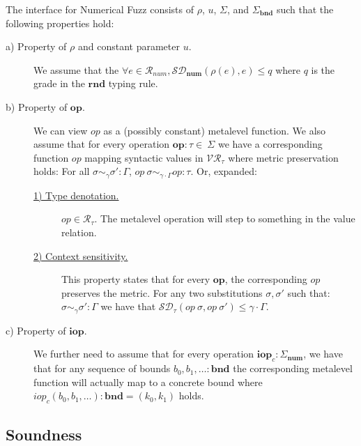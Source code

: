 \begin{definition}
  \label{def:numfuzz-interface}
  The interface for Numerical Fuzz consists of $\rho$, $u$, $\Sigma$, and
  $\Sigma_{\mathbf{bnd}}$ such that the following properties hold: 
\begin{description}
  \item[a) Property of $\rho$ and constant parameter $u$.] We assume that the
    $\forall e \in \mathcal{R}_{num}, \mathcal{SD}_{\mathbf{num}}(\rho(e), e)
    \leq q$ where $q$ is the grade in the $\mathbf{rnd}$ typing rule.
  \item[b) Property of $\mathbf{op}$.] 
    We can view $\textit{op}$ as a (possibly constant) metalevel function.
    We also assume that for every operation
    $\mathbf{op} : \tau \in \ \Sigma$ we have a
    corresponding function $op$ mapping syntactic values in
    $\mathcal{VR}_{\tau}$ where metric preservation holds: For all $\sigma
    \sim_{\gamma} \sigma' : \Gamma$, $\textit{op}~\sigma \sim_{\gamma \cdot
    \Gamma} \textit{op} : \tau$.
    Or, expanded:
    \begin{description}
      \item[\underline{1) Type denotation.}] $\mathit{op} \in
        \mathcal{R}_{\tau}$. The metalevel operation will step to something in the
        value relation.
      \item[\underline{2) Context sensitivity.}]
        This property states that for every $\textbf{op}$, the
        corresponding $\textit{op}$ preserves the metric. For any two
        substitutions $\sigma, \sigma'$ such that:
        $\sigma \sim_{\gamma} \sigma' : \Gamma$
        we have that
        $\mathcal{SD}_{\tau}(\textit{op}~\sigma, \textit{op}~\sigma') \leq \gamma \cdot \Gamma$.
    \end{description} \item[c) Property of $\mathbf{iop}$.] We further need to
      assume that for every operation $\mathbf{iop}_c : \Sigma_\textbf{num}$, we
      have that for any sequence of bounds $b_0, b_1, \ldots : \textbf{bnd}$ the
      corresponding metalevel function will actually map to a concrete bound
      where $\textit{iop}_c(b_0, b_1, \ldots) : \textbf{bnd} = (k_0, k_1)$
      holds.
\end{description}
\end{definition}

\subsection{Soundness} \label{sec:soundness}


